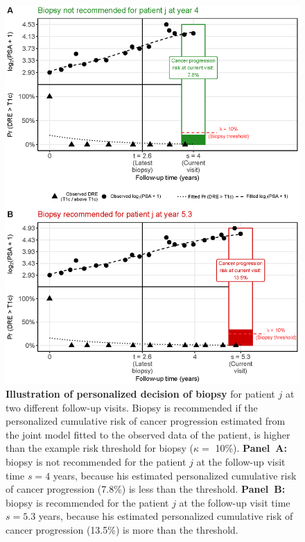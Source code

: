 \begin{figure}[!htb]
\captionsetup{justification=justified}
\centerline{\includegraphics[width=\columnwidth]{images/dynRiskPlot_2340.eps}}
\caption{\textbf{Illustration of personalized decision of biopsy} for patient $j$ at two different follow-up visits. Biopsy is recommended if the personalized cumulative risk of cancer progression estimated from the joint model fitted to the observed data of the patient, is higher than the example risk threshold for biopsy ($\kappa=$ 10\%). \textbf{Panel~A:} biopsy is not recommended for the patient $j$ at the follow-up visit time $s=4$ years, because his estimated personalized cumulative risk of cancer progression (7.8\%) is less than the threshold. \textbf{Panel~B:} biopsy is recommended for the patient $j$ at the follow-up visit time $s=5.3$ years, because his estimated personalized cumulative risk of cancer progression (13.5\%) is more than the threshold.}
\label{fig:dynRiskPlot_2340}
\end{figure}

